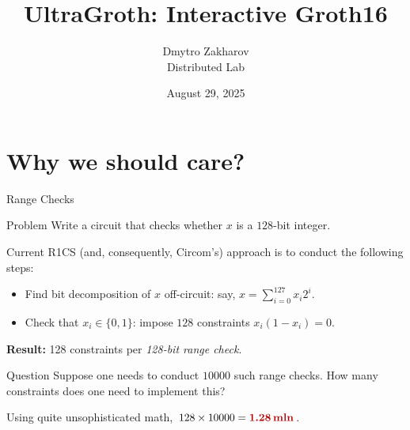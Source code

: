 \documentclass{zkdl-presentation-template}
\title[UltraGroth]{UltraGroth: Interactive Groth16}
\author{Dmytro Zakharov \\ Distributed Lab}
\date{August 29, 2025}
\begin{document}

	\section{Why we should care?}

    \begin{frame}{Range Checks}
        \begin{block}{Problem}
            Write a circuit that checks whether $x$ is a $128$-bit integer.
        \end{block}

        Current R1CS (and, consequently, Circom's) approach is to 
        conduct the following steps:
        \begin{itemize}
            \item Find bit decomposition of $x$ off-circuit: say, $x=\sum_{i=0}^{127}x_i2^i$.
            \item Check that $x_i \in \{0,1\}$: impose $128$ constraints $x_i(1-x_i)=0$.
        \end{itemize}

        \textbf{Result:} 128 constraints per \textit{128-bit range check}.

        \begin{alertblock}{Question}
            Suppose one needs to conduct $10000$ such range checks. How many 
            constraints does one need to implement this?
        \end{alertblock}
        
        Using quite unsophisticated math, $128 \times 10000 = \textcolor{red!70!black}{\textbf{1.28\,\text{mln}}}$.
    \end{frame}
\end{document}
